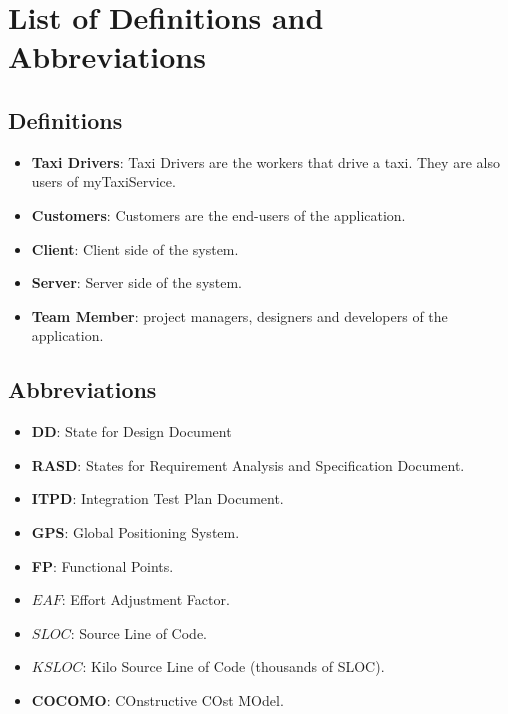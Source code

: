\documentclass[../../../../testPlan.tex]{subfiles}
\begin{document}
	\section{List of Definitions and Abbreviations}

		\subsection{Definitions}
			\begin{itemize}
				\item \textbf{Taxi Drivers}: Taxi Drivers are the workers that drive a taxi. They are also users of myTaxiService.
				\item \textbf{Customers}: Customers are the end-users of the application.
				\item \textbf{Client}: Client side of the system.
				\item \textbf{Server}: Server side of the system.
				\item \textbf{Team Member}: project managers, designers and developers of the application.
			\end{itemize}

		\subsection{Abbreviations}
			\begin{itemize}
				\item \textbf{DD}: State for Design Document
				\item \textbf{RASD}: States for Requirement Analysis and Specification Document.
				\item \textbf{ITPD}: Integration Test Plan Document.
				\item \textbf{GPS}: Global Positioning System.
				\item \textbf{FP}: Functional Points.
				\item \textbf{\(EAF\)}: Effort Adjustment Factor.
				\item \textbf{\(SLOC\)}: Source Line of Code.
				\item \textbf{\(KSLOC\)}: Kilo Source Line of Code (thousands of SLOC).
				\item \textbf{COCOMO}: COnstructive COst MOdel.
			\end{itemize}
\end{document}
